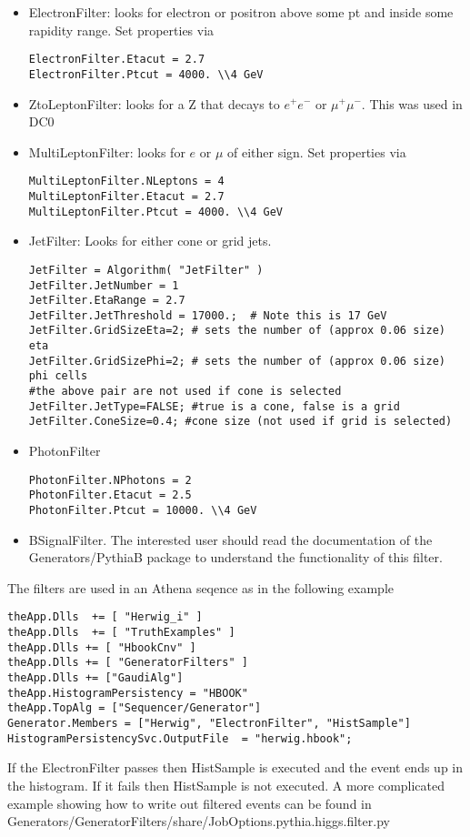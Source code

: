 \documentclass[11pt]{article}
\begin{document}
\begin{itemize}
\item ElectronFilter: looks for electron or positron above some pt and
inside some rapidity range. Set properties via
\begin{verbatim}
ElectronFilter.Etacut = 2.7
ElectronFilter.Ptcut = 4000. \\4 GeV
\end{verbatim}
\item ZtoLeptonFilter: looks for a Z that decays to $e^+e^-$ or
  $\mu^+\mu^-$. This was used in DC0
\item MultiLeptonFilter: looks for $e$ or $\mu$ of either sign. 
 Set properties via
\begin{verbatim}
MultiLeptonFilter.NLeptons = 4
MultiLeptonFilter.Etacut = 2.7
MultiLeptonFilter.Ptcut = 4000. \\4 GeV
\end{verbatim}
\item JetFilter: Looks for either cone or grid jets.
\begin{verbatim}
JetFilter = Algorithm( "JetFilter" )
JetFilter.JetNumber = 1
JetFilter.EtaRange = 2.7
JetFilter.JetThreshold = 17000.;  # Note this is 17 GeV
JetFilter.GridSizeEta=2; # sets the number of (approx 0.06 size) eta
JetFilter.GridSizePhi=2; # sets the number of (approx 0.06 size) phi cells
#the above pair are not used if cone is selected
JetFilter.JetType=FALSE; #true is a cone, false is a grid
JetFilter.ConeSize=0.4; #cone size (not used if grid is selected)
\end{verbatim}
\item PhotonFilter
\begin{verbatim}
PhotonFilter.NPhotons = 2
PhotonFilter.Etacut = 2.5
PhotonFilter.Ptcut = 10000. \\4 GeV
\end{verbatim}
\item BSignalFilter. The interested user should read the documentation of the Generators/PythiaB
  package to understand the functionality of this filter.
\end{itemize}


The filters are used in an Athena seqence as in the following example
\begin{verbatim}
theApp.Dlls  += [ "Herwig_i" ]
theApp.Dlls  += [ "TruthExamples" ]
theApp.Dlls += [ "HbookCnv" ]
theApp.Dlls += [ "GeneratorFilters" ]
theApp.Dlls += ["GaudiAlg"]
theApp.HistogramPersistency = "HBOOK"
theApp.TopAlg = ["Sequencer/Generator"]
Generator.Members = ["Herwig", "ElectronFilter", "HistSample"]
HistogramPersistencySvc.OutputFile  = "herwig.hbook";
\end{verbatim}
If the ElectronFilter passes then HistSample is executed and the event
ends up in the histogram. If it fails then HistSample is not
executed. A more complicated example showing how to write out
filtered events can be found in
Generators/GeneratorFilters/share/JobOptions.pythia.higgs.filter.py
\end{document}
